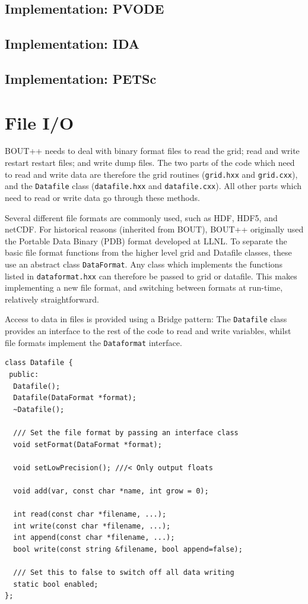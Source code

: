 \documentclass[12pt]{article}
\newcommand{\code}[1]{\texttt{#1}}
\begin{document}
\subsection{Implementation: PVODE}


\subsection{Implementation: IDA}

\subsection{Implementation: PETSc}

\section{File I/O}

BOUT++ needs to deal with binary format files to read the grid;
read and write restart restart files; and write dump files. 
The two parts of the code which need to read and write data are therefore
the grid routines (\code{grid.hxx} and \code{grid.cxx}), and the
\code{Datafile} class (\code{datafile.hxx} and \code{datafile.cxx}).
All other parts which need to read or write data go through these
methods.

Several different file formats are commonly used, such as HDF, HDF5, and netCDF. 
For historical reasons (inherited from BOUT), BOUT++ originally used the
Portable Data Binary (PDB) format developed at LLNL. 
To separate the basic file format functions from the higher level grid and 
Datafile classes, these use an abstract class \code{DataFormat}. Any
class which implements the functions listed in \code{dataformat.hxx}
can therefore be passed to grid or datafile. This makes implementing
a new file format, and switching between formats at run-time, 
relatively straightforward.


Access to data in files is provided using a Bridge pattern: The
\code{Datafile} class provides an interface to the rest of the code
to read and write variables, whilst file formats implement the
\code{Dataformat} interface. 
\begin{lstlisting}
class Datafile {
 public:
  Datafile();
  Datafile(DataFormat *format);
  ~Datafile();
  
  /// Set the file format by passing an interface class
  void setFormat(DataFormat *format);

  void setLowPrecision(); ///< Only output floats

  void add(var, const char *name, int grow = 0);

  int read(const char *filename, ...);
  int write(const char *filename, ...);
  int append(const char *filename, ...);
  bool write(const string &filename, bool append=false);

  /// Set this to false to switch off all data writing
  static bool enabled;
};
\end{lstlisting}
\end{document}

